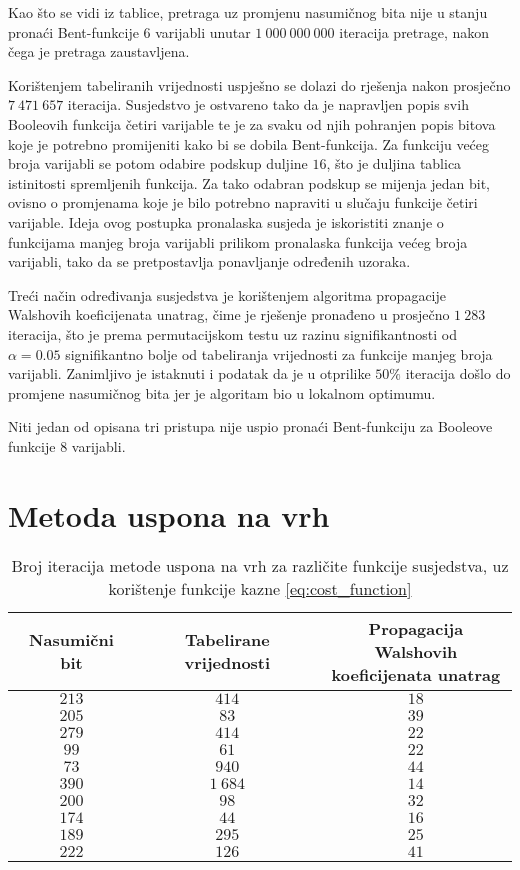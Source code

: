 Kao što se vidi iz tablice, pretraga uz promjenu nasumičnog bita nije u stanju pronaći Bent-funkcije $6$ varijabli unutar $1\:000\:000\:000$ iteracija pretrage, nakon čega je pretraga zaustavljena.

Korištenjem tabeliranih vrijednosti uspješno se dolazi do rješenja nakon prosječno $7\:471\:657$ iteracija.
Susjedstvo je ostvareno tako da je napravljen popis svih Booleovih funkcija četiri varijable te je za svaku od njih pohranjen popis bitova koje je potrebno promijeniti kako bi se dobila Bent-funkcija.
Za funkciju većeg broja varijabli se potom odabire podskup duljine $16$, što je duljina tablica istinitosti spremljenih funkcija.
Za tako odabran podskup se mijenja jedan bit, ovisno o promjenama koje je bilo potrebno napraviti u slučaju funkcije četiri varijable.
Ideja ovog postupka pronalaska susjeda je iskoristiti znanje o funkcijama manjeg broja varijabli prilikom pronalaska funkcija većeg broja varijabli, tako da se pretpostavlja ponavljanje određenih uzoraka.

Treći način određivanja susjedstva je korištenjem algoritma propagacije Walshovih koeficijenata unatrag, čime je rješenje pronađeno u prosječno $1\:283$ iteracija, što je prema permutacijskom testu uz razinu signifikantnosti od $\alpha = 0.05$ signifikantno bolje od tabeliranja vrijednosti za funkcije manjeg broja varijabli.
Zanimljivo je istaknuti i podatak da je u otprilike $50\%$ iteracija došlo do promjene nasumičnog bita jer je algoritam bio u lokalnom optimumu.

Niti jedan od opisana tri pristupa nije uspio pronaći Bent-funkciju za Booleove funkcije $8$ varijabli.

\section{Metoda uspona na vrh}
\begin{table}[]
    \centering
    \begin{tabular}{ccc}
        Nasumični bit & Tabelirane vrijednosti & \makecell{Propagacija Walshovih \\ koeficijenata unatrag} \\ \hline
        $213$ &    $414$ & $18$ \\
        $205$ &     $83$ & $39$ \\
        $279$ &    $414$ & $22$ \\
         $99$ &     $61$ & $22$ \\
         $73$ &    $940$ & $44$ \\
        $390$ & $1\:684$ & $14$ \\
        $200$ &     $98$ & $32$ \\
        $174$ &     $44$ & $16$ \\
        $189$ &    $295$ & $25$ \\
        $222$ &    $126$ & $41$
    \end{tabular}
    \captionsetup{justification=centering}
    \caption{Broj iteracija metode uspona na vrh za različite funkcije susjedstva, uz korištenje funkcije kazne \eqref{eq:cost_function}}
    \label{tbl:greedy_6}
\end{table}

